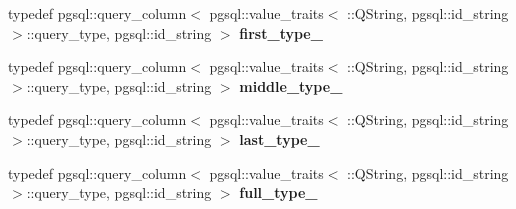 \begin{DoxyCompactItemize}
\item 
typedef pgsql\+::query\+\_\+column$<$ pgsql\+::value\+\_\+traits$<$ \+::Q\+String, pgsql\+::id\+\_\+string $>$\+::query\+\_\+type, pgsql\+::id\+\_\+string $>$ {\bfseries first\+\_\+type\+\_\+}\hypertarget{structodb_1_1pointer__query__columns_3_01_1_1kpk_1_1data_1_1_person_00_01id__pgsql_00_01_a_01_4_1_1name__class___a43284f7105dac8c6d8188ea75e4e12f1}{}\label{structodb_1_1pointer__query__columns_3_01_1_1kpk_1_1data_1_1_person_00_01id__pgsql_00_01_a_01_4_1_1name__class___a43284f7105dac8c6d8188ea75e4e12f1}

\item 
typedef pgsql\+::query\+\_\+column$<$ pgsql\+::value\+\_\+traits$<$ \+::Q\+String, pgsql\+::id\+\_\+string $>$\+::query\+\_\+type, pgsql\+::id\+\_\+string $>$ {\bfseries middle\+\_\+type\+\_\+}\hypertarget{structodb_1_1pointer__query__columns_3_01_1_1kpk_1_1data_1_1_person_00_01id__pgsql_00_01_a_01_4_1_1name__class___a2fa4e65fd65136f859fccfd52ace3768}{}\label{structodb_1_1pointer__query__columns_3_01_1_1kpk_1_1data_1_1_person_00_01id__pgsql_00_01_a_01_4_1_1name__class___a2fa4e65fd65136f859fccfd52ace3768}

\item 
typedef pgsql\+::query\+\_\+column$<$ pgsql\+::value\+\_\+traits$<$ \+::Q\+String, pgsql\+::id\+\_\+string $>$\+::query\+\_\+type, pgsql\+::id\+\_\+string $>$ {\bfseries last\+\_\+type\+\_\+}\hypertarget{structodb_1_1pointer__query__columns_3_01_1_1kpk_1_1data_1_1_person_00_01id__pgsql_00_01_a_01_4_1_1name__class___a7c1589ec56f30c249585fbb285c188d6}{}\label{structodb_1_1pointer__query__columns_3_01_1_1kpk_1_1data_1_1_person_00_01id__pgsql_00_01_a_01_4_1_1name__class___a7c1589ec56f30c249585fbb285c188d6}

\item 
typedef pgsql\+::query\+\_\+column$<$ pgsql\+::value\+\_\+traits$<$ \+::Q\+String, pgsql\+::id\+\_\+string $>$\+::query\+\_\+type, pgsql\+::id\+\_\+string $>$ {\bfseries full\+\_\+type\+\_\+}\hypertarget{structodb_1_1pointer__query__columns_3_01_1_1kpk_1_1data_1_1_person_00_01id__pgsql_00_01_a_01_4_1_1name__class___a1f8be0ff41028387fa183eb9ec03f136}{}\label{structodb_1_1pointer__query__columns_3_01_1_1kpk_1_1data_1_1_person_00_01id__pgsql_00_01_a_01_4_1_1name__class___a1f8be0ff41028387fa183eb9ec03f136}

\end{DoxyCompactItemize}
